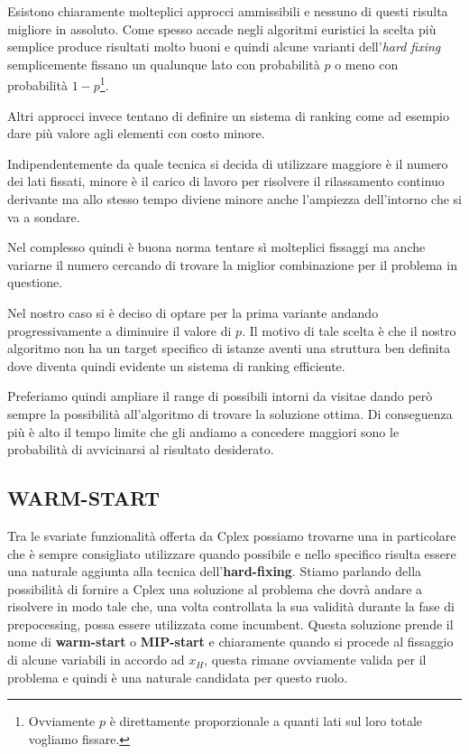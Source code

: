 \documentclass[11pt]{article}
\begin{document}
Esistono chiaramente molteplici approcci ammissibili e nessuno di questi risulta migliore in assoluto. Come spesso accade negli algoritmi euristici la scelta più semplice produce risultati molto buoni e quindi alcune varianti dell'\textit{hard fixing} semplicemente fissano un qualunque lato con probabilità $p$ o meno con probabilità $1-p$\footnote{Ovviamente $p$ è direttamente proporzionale a quanti lati sul loro totale vogliamo fissare.}.

Altri approcci invece tentano di definire un sistema di ranking come ad esempio dare più valore agli elementi con costo minore.

Indipendentemente da quale tecnica si decida di utilizzare maggiore è il numero dei lati fissati, minore è il carico di lavoro per risolvere il rilassamento continuo derivante ma allo stesso tempo diviene minore anche l'ampiezza dell'intorno che si va a sondare.

Nel complesso quindi è buona norma tentare sì molteplici fissaggi ma anche variarne il numero cercando di trovare la miglior combinazione per il problema in questione.

Nel nostro caso si è deciso di optare per la prima variante andando progressivamente a diminuire il valore di $p$. Il motivo di tale scelta è che il nostro algoritmo non ha un target specifico di istanze aventi una struttura ben definita dove diventa quindi evidente un sistema di ranking efficiente.

Preferiamo quindi ampliare il range di possibili intorni da visitae dando però sempre la possibilità all'algoritmo di trovare la soluzione ottima. Di conseguenza più è alto il tempo limite che gli andiamo a concedere maggiori sono le probabilità di avvicinarsi al risultato desiderato.

\subsection*{WARM-START}

Tra le svariate funzionalità offerta da Cplex possiamo trovarne una in particolare che è sempre consigliato utilizzare quando possibile e nello specifico risulta essere una naturale aggiunta alla tecnica dell'\textbf{hard-fixing}. Stiamo parlando della possibilità di fornire a Cplex una soluzione al problema che dovrà andare a risolvere in modo tale che, una volta controllata la sua validità durante la fase di prepocessing, possa essere utilizzata come incumbent. Questa soluzione prende il nome di \textbf{warm-start} o \textbf{MIP-start} e chiaramente quando si procede al fissaggio di alcune variabili in accordo ad $x_H$, questa rimane ovviamente valida per il problema e quindi è una naturale candidata per questo ruolo.
\end{document}
